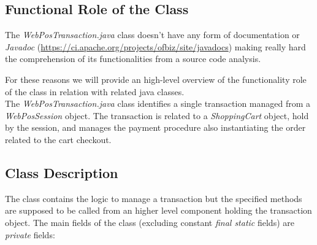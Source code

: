 \subsection{Functional Role of the Class}
The \emph{WebPosTransaction.java} class doesn't have any form of documentation or \emph{Javadoc} (\url{https://ci.apache.org/projects/ofbiz/site/javadocs}) making really hard the comprehension of its functionalities from a source code analysis.

For these reasons we will provide an high-level overview of the functionality role of the class in relation with related java classes.\\

The \emph{WebPosTransaction.java} class identifies a single transaction managed from a \emph{WebPosSession} object. The transaction is related to a \emph{ShoppingCart} object, hold by the session, and manages the payment procedure also instantiating the order related to the cart checkout. \\

\subsection{Class Description}
The class contains the logic to manage a transaction but the specified methods are supposed to be called from an higher level component holding the transaction object.
The main fields of the class (excluding constant \emph{final static} fields)  are \emph{private} fields:

